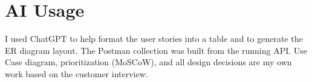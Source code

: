 \documentclass[11pt, a4paper]{article}
\begin{document}

\section{AI Usage}

I used ChatGPT to help format the user stories into a table and to generate the ER diagram layout. The Postman collection was built from the running API. Use Case diagram, prioritization (MoSCoW), and all design decisions are my own work based on the customer interview.
\end{document}
